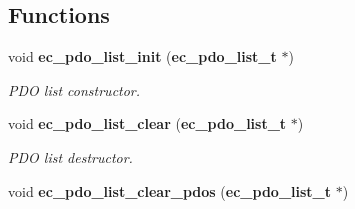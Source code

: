\subsection*{Functions}
\begin{DoxyCompactItemize}
\item 
void {\bf ec\-\_\-pdo\-\_\-list\-\_\-init} ({\bf ec\-\_\-pdo\-\_\-list\-\_\-t} $\ast$)\label{pdo__list_8h_aee1095c2e92c859063b1ed782e5bf7d6}

\begin{DoxyCompactList}\small\item\em P\-D\-O list constructor. \end{DoxyCompactList}\item 
void {\bf ec\-\_\-pdo\-\_\-list\-\_\-clear} ({\bf ec\-\_\-pdo\-\_\-list\-\_\-t} $\ast$)\label{pdo__list_8h_aa9f079345fae9a1b8ceb9d142ff41368}

\begin{DoxyCompactList}\small\item\em P\-D\-O list destructor. \end{DoxyCompactList}\item 
void {\bf ec\-\_\-pdo\-\_\-list\-\_\-clear\-\_\-pdos} ({\bf ec\-\_\-pdo\-\_\-list\-\_\-t} $\ast$)\label{pdo__list_8h_a6b1d3da4ada951f662be5dc4c8519026}


\end{DoxyCompactItemize}

